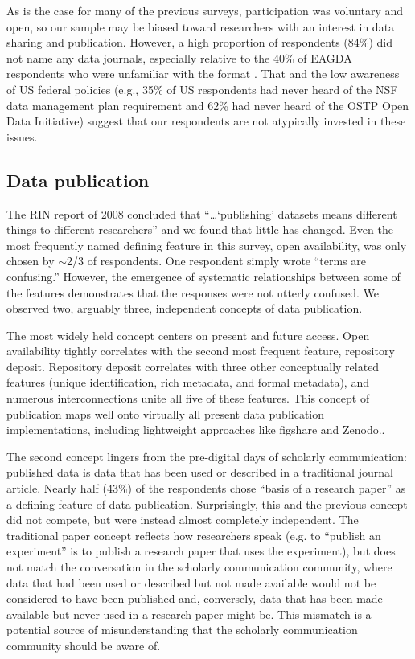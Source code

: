 \documentclass[10pt]{article}
\begin{document}
As is the case for many of the previous surveys, participation was voluntary and open, so our sample may be biased toward researchers with an interest in data sharing and publication.
However, a high proportion of respondents (84\%) did not name any data journals, especially relative to the 40\% of EAGDA respondents who were unfamiliar with the format \cite{bobrow_establishing_2014}.
That and the low awareness of US federal policies (e.g., 35\% of US respondents had never heard of the NSF data management plan requirement and 62\% had never heard of the OSTP Open Data Initiative) suggest that our respondents are not atypically invested in these issues.

\subsection*{Data publication}

The RIN report of 2008 concluded that ``\ldots`publishing' datasets means different things to different researchers'' \cite{swan_share_2008} and we found that little has changed.
Even the most frequently named defining feature in this survey, open availability, was only chosen by $\sim$2/3 of respondents.
One respondent simply wrote ``terms are confusing.''
However, the emergence of systematic relationships between some of the features demonstrates that the responses were not utterly confused.
We observed two, arguably three, independent concepts of data publication.

The most widely held concept centers on present and future access.
Open availability tightly correlates with the second most frequent feature, repository deposit.
Repository deposit correlates with three other conceptually related features (unique identification, rich metadata, and formal metadata), and numerous interconnections unite all five of these features.
This concept of publication maps well onto virtually all present data publication implementations, including lightweight approaches like figshare and Zenodo..

The second concept lingers from the pre-digital days of scholarly communication: published data is data that has been used or described in a traditional journal article. 
Nearly half (43\%) of the respondents chose ``basis of a research paper'' as a defining feature of data publication. 
Surprisingly, this and the previous concept did not compete, but were instead almost completely independent.
The traditional paper concept reflects how researchers speak (e.g. to ``publish an experiment'' is to publish a research paper that uses the experiment), but does not match the conversation in the scholarly communication community, where data that had been used or described but not made available would not be considered to have been published and, conversely, data that has been made available but never used in a research paper might be.
This mismatch is a potential source of misunderstanding that the scholarly communication community should be aware of.
\end{document}
